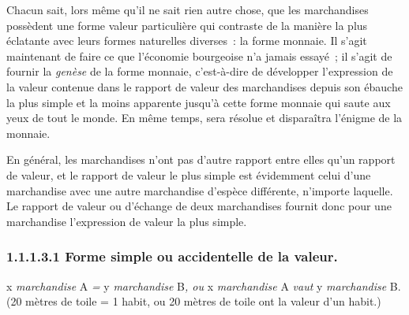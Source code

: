 \documentclass[french,twoside]{book} %
\begin{document}
Chacun sait, lors même qu’il ne sait rien autre chose, que les marchandises possèdent une forme valeur particulière qui contraste de la manière la plus éclatante avec leurs formes naturelles diverses : la forme monnaie. Il s’agit maintenant de faire ce que l’économie bourgeoise n’a jamais essayé ; il s’agit de fournir la \emph{genèse} de la forme monnaie, c’est-à-dire de développer l’expression de la valeur contenue dans le rapport de valeur des marchandises depuis son ébauche la plus simple et la moins apparente jusqu’à cette forme monnaie qui saute aux yeux de tout le monde. En même temps, sera résolue et disparaîtra l’énigme de la monnaie.\par
En général, les marchandises n’ont pas d’autre rapport entre elles qu’un rapport de valeur, et le rapport de valeur le plus simple est évidemment celui d’une marchandise avec une autre marchandise d’espèce différente, n’importe laquelle. Le rapport de valeur ou d’échange de deux marchandises fournit donc pour une marchandise l’expression de valeur la plus simple.\par
\subsubsection[{1.1.1.3.1 Forme simple ou accidentelle de la valeur.}]{1.1.1.3.1 Forme simple ou accidentelle de la valeur.}
\noindent x\emph{ marchandise} A\emph{ =} y\emph{ marchandise} B\emph{, ou} x\emph{ marchandise} A\emph{ vaut} y\emph{ marchandise} B.(20 mètres de toile = 1 habit, ou 20 mètres de toile ont la valeur d’un habit.)\par
\end{document}

